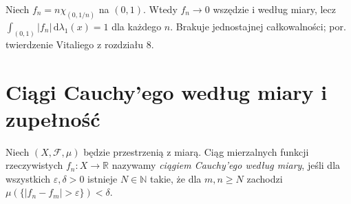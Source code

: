 \begin{przyklad}
Niech $f_n=n\chi_{(0,1/n)}$ na $(0,1)$.
Wtedy $f_n\to0$ wszędzie i według miary, lecz
$\int_{(0,1)}|f_n|\,\mathrm d\lambda_1(x)=1$
dla każdego $n$. Brakuje jednostajnej całkowalności;
por. twierdzenie Vitaliego z rozdziału 8.
\end{przyklad}

\section{Ciągi Cauchy'ego według miary i zupełność}

\begin{definicja}
\label{def:cauchy-measure-9}
Niech $(X,\mathcal F,\mu)$ będzie przestrzenią z miarą.
Ciąg mierzalnych funkcji rzeczywistych
$f_n:X\to\mathbb R$ nazywamy \emph{ciągiem Cauchy'ego według miary}, jeśli
dla wszystkich $\varepsilon,\delta>0$ istnieje
$N\in\mathbb N$ takie, że dla $m,n\ge N$
zachodzi $\mu(\{|f_n-f_m|>\varepsilon\})<\delta$.
\end{definicja}

